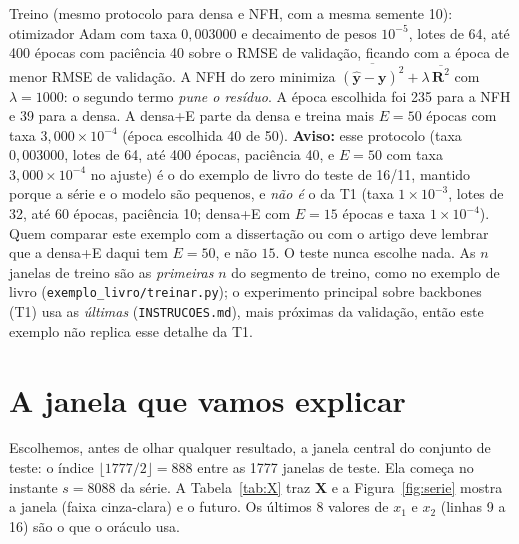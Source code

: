 \documentclass[11pt,a4paper]{article}
\newcommand{\bR}{\mathbf{R}}\newcommand{\byh}{\hat{\mathbf{y}}}\newcommand{\bX}{\mathbf{X}}
\begin{document}
Treino (mesmo protocolo para densa e NFH, com a mesma semente 10): otimizador Adam com taxa $0,003000$ e decaimento de pesos $10^{-5}$, lotes de 64, até 400 épocas com paciência 40 sobre o RMSE de validação, ficando com a época de menor RMSE de validação. A NFH do zero minimiza $\overline{(\byh-\mathbf y)^2}+\lambda\,\overline{\bR^2}$ com $\lambda=1000$: o segundo termo \emph{pune o resíduo}. A época escolhida foi 235 para a NFH e 39 para a densa. A densa+E parte da densa e treina mais $E=50$ épocas com taxa $3,000\times 10^{-4}$ (época escolhida 40 de 50). \textbf{Aviso:} esse protocolo (taxa $0,003000$, lotes de 64, até 400 épocas, paciência 40, e $E=50$ com taxa $3,000\times 10^{-4}$ no ajuste) é o do exemplo de livro do teste de 16/11, mantido porque a série e o modelo são pequenos, e \emph{não é} o da T1 (taxa $1\times10^{-3}$, lotes de 32, até 60 épocas, paciência 10; densa+E com $E=15$ épocas e taxa $1\times10^{-4}$). Quem comparar este exemplo com a dissertação ou com o artigo deve lembrar que a densa+E daqui tem $E=50$, e não $15$. O teste nunca escolhe nada. As $n$ janelas de treino são as \emph{primeiras} $n$ do segmento de treino, como no exemplo de livro (\texttt{exemplo\_livro/treinar.py}); o experimento principal sobre backbones (T1) usa as \emph{últimas} (\texttt{INSTRUCOES.md}), mais próximas da validação, então este exemplo não replica esse detalhe da T1.

\section{A janela que vamos explicar}\label{sec:janela}

Escolhemos, antes de olhar qualquer resultado, a janela central do conjunto de teste: o índice $\lfloor1777/2\rfloor=888$ entre as 1777 janelas de teste. Ela começa no instante $s=8088$ da série. A Tabela~\ref{tab:X} traz $\bX$ e a Figura~\ref{fig:serie} mostra a janela (faixa cinza-clara) e o futuro. Os últimos 8 valores de $x_1$ e $x_2$ (linhas 9 a 16) são o que o oráculo usa.
\end{document}
